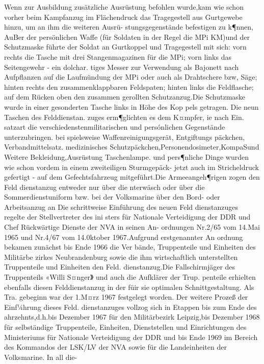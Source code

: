 Wenn zur Ausbildung zusätzliche Ausrüstung
befohlen wurde,kam wie schon vorher beim
Kampfanzug im Flächendruck das Tragegestell aus
Gurtgewebe hinzu, um an ihm die weiteren Ausrü-
stungsgegenstände befestigen zu k¶nnen, AuBer der
persönlichen Waffe (für Soldaten in der Regel die
MPi KM)und der Schutzmaske führte der Soldat
an Gurtkoppel und Tragegestell mit sich: vorn
rechts die Tasche mit drei Stangenmagazinen für
die MPi; vorn links das Seitengewehr - ein dolchar.
tiges Messer zur Verwendung als Bajonett nach Aufpflanzen auf die Laufmündung der MPi oder
auch als Drahtschere bzw, Säge; hinten rechts den
zusammenklappbaren Feldspaten; hinten links die
Feldflasche; auf dem Rücken oben den zusammen
gerollten Schutzanzug.Die Schutzmaske wurde in
einer gesonderten Tasche links in Höhe des Kop
pels getragen. Die neun Taschen des Felddienstan.
zuges erm¶glichten es dem K¤mpfer, ie nach Ein.
satzart die verschiedenstenmilitarischen
und
persónlichen Gegenstände unterzubringen.
bei
spielsweise
Waffenreinigungsgerät, Entgiftungs
päckchen,
Verbandmittelsatz.
medizinisches
Schutzpäckchen,Personendosimeter,KompaSund
Weitere Bekleidung,Ausrüstung
Taschenlampe.
und pers¶nliche Dinge wurden wie schon vordem
in einem zweiteiligen Sturmgepäck- jetzt auch im
Stricheldruck gefertigt - auf dem Gefechtsfahrzeug
mitgeführt.Die Armeeangeh¶rigen zogen den Feld
dienstanzug entweder nur über die nterwäsch
oder über die Sommerdienstuniform bzw. bei der
Volksmarine über den Bord- oder Arbeitsanzug an
Die schrittweise Einführung des neuen Feld
dienstanzuges regelte der Stellvertreter des ini
sters für Nationale Verteidigung der DDR und
Chef Rückwärtige Dienste der NVA in seinen An-
ordnungen Nr.2/65 vom 14.Mai 1965 und Nr.4/67
vom 14.0ktober 1967.Aufgrund erstgenannter An
ordnung bekamen zunächst bis Ende 1966 die Ver
bände, Truppenteile und Einheiten des Militärbe
zirkes Neubrandenburg sowie die ihm wirtschaftlich
unterstellten Truppenteile und Einheiten den Feld.
dienstanzug.Die Fallschirmjäger des Truppenteils
«Willi S¤nger》 und auch die Aufklärer der Trup.
penteile erhielten ebenfalls diesen Felddienstanzug
in der füir sie optimalen Schnittgestaltung. Als Tra.
gebeginn war der 1.M¤rz 1967 festgelegt worden.
Der weitere Prozeß der Einf¼hrung dieses Feld.
dienstanzuges vollzog sich in Etappen bis zum
Ende des ahrzehnts,d.h.bis Dezember 1967 für
den Militärbezirk Leipzig,bis Dezember 1968 für
selbständige Truppenteile, Einheiten, Dienststellen
und Einrichtungen des Ministeriums für Nationale
Verteidigung der DDR und bis Ende 1969 im Bereich des Kommandos der LSK/LV der NVA sowie
für die Landeinheiten der Volksmarine. In all die-
